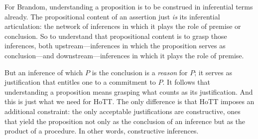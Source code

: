 For Brandom, understanding a proposition is to be construed in
inferential terms already.  The propositional content of an assertion
just \textit{is} its inferential articulation: the network of
inferences in which it plays the role of premise or conclusion.  So to
understand that propositional content is to grasp those inferences,
both upstream---inferences in which the proposition serves as
conclusion---and downstream---inferences in which it plays the role of
premise.


But an inference of which \(P\) is the conclusion is a \textit{reason}
for \(P\); it serves as justification that entitles one to a
commitment to \(P\).  It follows that understanding a proposition
means grasping what counts as its justification.  And this is just
what we need for HoTT.  The only difference is that HoTT imposes an
additional constraint: the only acceptable justifications are
constructive, ones that yield the proposition not only as the
conclusion of an inference but as the product of a procedure.  In
other words, constructive inferences.

